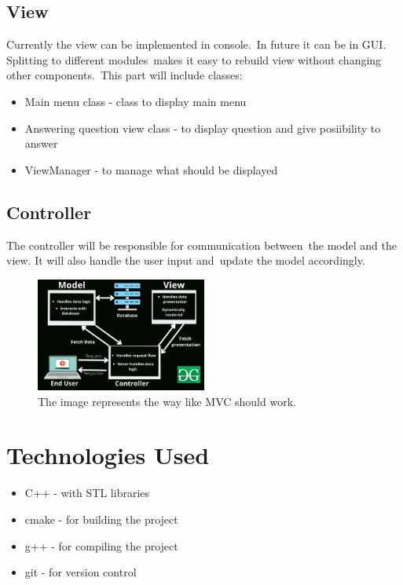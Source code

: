 \documentclass[a4paper,12pt]{article}
\begin{document}
\subsection{View}
Currently the view can be implemented in console.\
In future it can be in GUI. Splitting to different modules\
makes it easy to rebuild view without changing other components.\
This part will include classes:
\begin{itemize}
    \item Main menu class - class to display main menu
    \item Answering question view class - to display question and give posiibility to answer
    \item ViewManager - to manage what should be displayed
\end{itemize}
\subsection{Controller}
The controller will be responsible for communication between\
the model and the view. It will also handle the user input and\
update the model accordingly.\newline \newline

\begin{figure}[h]
    \centering
    \includegraphics[width=0.5\textwidth]{images/Model1.png}
    \caption{The image represents the way like MVC should work.}
    \label{fig:class_diagram}
\end{figure}



\section{Technologies Used}
\begin{itemize}
    \item C++ - with STL libraries
    \item cmake - for building the project
    \item g++ - for compiling the project
    \item git - for version control
\end{itemize}
\end{document}
